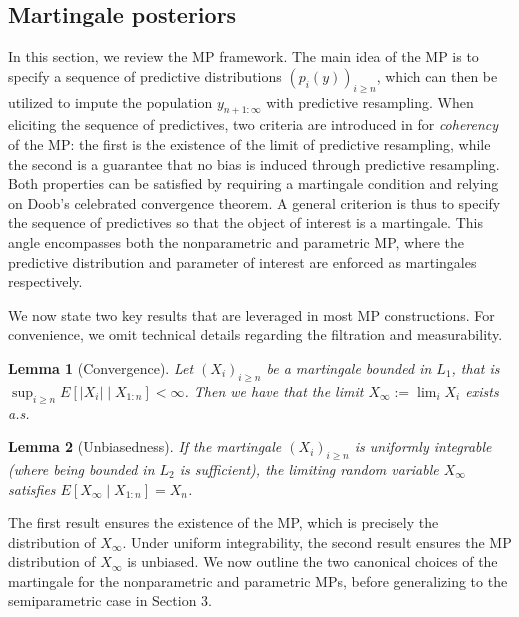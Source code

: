 \documentclass[11pt,a4paper]{article}
\theoremstyle{plain}
\newtheorem{lemma}{Lemma}
\theoremstyle{remark}
\theoremstyle{remark}
\begin{document}
\subsection{Martingale posteriors}
In this section, we review the MP framework. The main idea of the MP is to specify a sequence of predictive distributions $\left(p_i(y)\right)_{i \geq n}$, which can then be utilized to impute the population $y_{n+1:\infty}$ with predictive resampling. When eliciting the sequence of predictives, two criteria are introduced in \cite{fong2023martingale} for \textit{coherency} of the MP: the first is the existence of the limit of predictive resampling, while the second is a guarantee that no bias is induced through predictive resampling. Both properties can be satisfied by requiring a martingale condition and  relying on  Doob's celebrated convergence theorem. 
A general criterion is thus to specify the sequence of predictives so that the object of interest is a martingale. This angle encompasses both the nonparametric and parametric MP, where the predictive distribution and parameter of interest are enforced as martingales respectively. 


We now state two key results that are leveraged in most MP constructions. For convenience, we omit technical details regarding the filtration and measurability.
\begin{lemma}[Convergence]\label{lem:1}
Let $(X_i)_{i \geq n}$ be a martingale bounded in $L_1$, that is 
$\sup_{i \geq n} E\left[|X_i| \mid X_{1:n}\right] < \infty$.
Then we have that the limit
$X_\infty:=\lim_i X_i$
exists a.s.
\end{lemma}
\begin{lemma}[Unbiasedness]\label{lem:2}
If the martingale $(X_i)_{i\geq n}$ is uniformly integrable (where being bounded in $L_2$ is sufficient), the limiting random variable $X_\infty$ satisfies
    $E[X_\infty \mid X_{1:n}]=X_n$.
\end{lemma}

The first result ensures the existence of the MP, which is precisely the distribution of $X_\infty$. Under uniform integrability, the second result ensures  the MP distribution of $X_\infty$ is unbiased. We now outline the two canonical choices of the martingale for the nonparametric and parametric MPs, before generalizing to the semiparametric case in Section 3.
\end{document}
